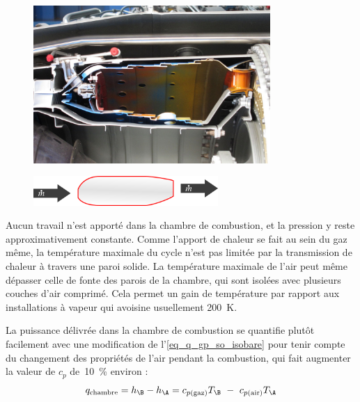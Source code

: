 		\begin{figure}
			\begin{center}
				\includegraphics[width=9cm]{images/photo_chambre_combustion.jpg}
			\end{center}
			\label{fig_chambre_de_combustion1}
		\end{figure}

		\begin{figure}
			\begin{center}
				\includegraphics[width=7cm]{images/symbole_chambre_combustion.png}
			\end{center}
			\label{fig_chambre_de_combustion2}
		\end{figure}

		Aucun travail n’est apporté dans la chambre de combustion, et la pression y reste approximativement constante.	Comme l’apport de chaleur se fait au sein du gaz même, la température maximale du cycle n’est pas limitée par la transmission de chaleur à travers une paroi solide. La température maximale de l’air peut même dépasser celle de fonte des parois de la chambre, qui sont isolées avec plusieurs couches d’air comprimé. Cela permet un gain de température par rapport aux installations à vapeur qui avoisine usuellement \SI{200}{\kelvin}.

		La puissance délivrée dans la chambre de combustion se quantifie plutôt facilement avec une modification de l’\cref{eq_q_gp_so_isobare} pour tenir compte du changement des propriétés de l’air pendant la combustion, qui fait augmenter la valeur de $c_p$ de~\SI{10}{\percent} environ :
		\begin{equation}
			q_\text{chambre} = h_\B - h_\A = c_{p \text{(gaz)}} T_\B \ - \ c_{p \text{(air)}} T_\A
		\end{equation}

